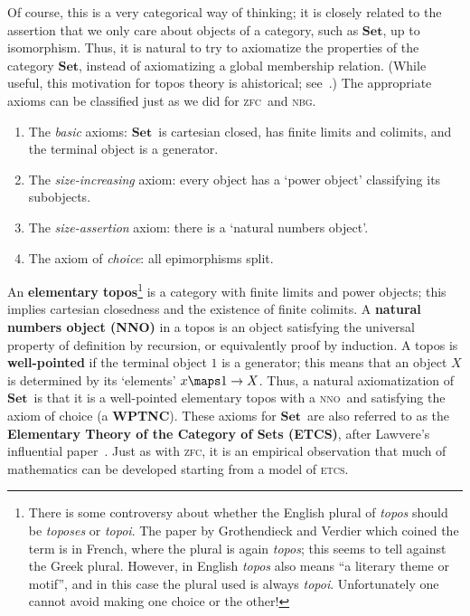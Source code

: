 \documentclass{amsart}
\newcommand{\Set}{\ensuremath{\mathbf{Set}}}
\def\zfc{\textsc{zfc}}
\def\nbg{\textsc{nbg}}
\def\etcs{\textsc{etcs}}
\def\nno{\textsc{nno}}
\begin{document}
Of course, this is a very categorical way of thinking; it is closely
related to the assertion that we only care about objects of a
category, such as \Set, up to isomorphism.  Thus, it is natural to try
to axiomatize the properties of the category \Set, instead of
axiomatizing a global membership relation.  (While useful, this
motivation for topos theory is ahistorical;
see~\cite{mclarty:hist-topos}.)  The appropriate axioms can be
classified just as we did for \zfc\ and \nbg.
\begin{enumerate}
\item The \emph{basic} axioms: \Set\ is cartesian closed, has finite
  limits and colimits, and the terminal object is a generator.
\item The \emph{size-increasing} axiom: every object has a `power
  object' classifying its subobjects.
\item The \emph{size-assertion} axiom: there is a `natural numbers
  object'.
\item The axiom of \emph{choice}: all epimorphisms split.
\end{enumerate}
An \textbf{elementary topos}\footnote{There is some controversy about
  whether the English plural of \emph{topos} should be \emph{toposes}
  or \emph{topoi}.  The paper by Grothendieck and Verdier which coined
  the term is in French, where the plural is again \emph{topos}; this
  seems to tell against the Greek plural.  However, in English
  \emph{topos} also means ``a literary theme or motif'', and in this
  case the plural used is always \emph{topoi}.  Unfortunately one
  cannot avoid making one choice or the other!}  is a category with
finite limits and power objects; this implies cartesian closedness and
the existence of finite colimits.  A \textbf{natural numbers object
  (NNO)} in a topos is an object satisfying the universal property of
definition by recursion, or equivalently proof by induction.  A topos
is \textbf{well-pointed} if the terminal object $1$ is a generator;
this means that an object $X$ is determined by its `elements' $x\maps
1\to X$.  Thus, a natural axiomatization of \Set\ is that it is a
well-pointed elementary topos with a \nno\ and satisfying the axiom of
choice (a \textbf{WPTNC}).  These axioms for \Set\ are also referred
to as the \textbf{Elementary Theory of the Category of Sets (ETCS)},
after Lawvere's influential
paper~\cite{lawvere:etcs,lawvere:etcs-long}.  Just as with \zfc, it is
an empirical observation that much of mathematics can be developed
starting from a model of \etcs.
\end{document}
